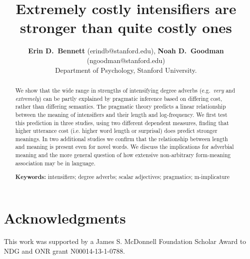 \documentclass[10pt,letterpaper]{article}
\title{Extremely costly intensifiers are stronger than quite costly ones}
\author{{\large \bf Erin D.~Bennett} (erindb@stanford.edu), {\large \bf Noah D.~Goodman} (ngoodman@stanford.edu)\\
  Department of Psychology, Stanford University.}
\newcommand{\w}[1]{\emph{#1}}
\begin{document}
\maketitle

\begin{abstract}

We show that the wide range in strengths of intensifying degree adverbs (e.g.~\w{very} and \w{extremely}) can be partly explained by pragmatic inference based on differing cost, rather than differing semantics.
The pragmatic theory predicts a linear relationship between the meaning of intensifiers and their length and log-frequency.
We first test this prediction in three studies, using two different dependent measures, finding that higher utterance cost (i.e. higher word length or surprisal) does predict stronger meanings.
In two additional studies we confirm that the relationship between length and meaning is present even for novel words.
We discuss the implications for adverbial meaning and the more general question of how extensive non-arbitrary form-meaning association may be in language.

\textbf{Keywords:} 
intensifiers; degree adverbs; scalar adjectives; pragmatics; m-implicature
\end{abstract}













\section{Acknowledgments}

This work was supported by a James S. McDonnell Foundation Scholar Award to NDG and ONR grant N00014-13-1-0788.





\setlength{\bibleftmargin}{.125in}
\setlength{\bibindent}{-\bibleftmargin}


\end{document}
